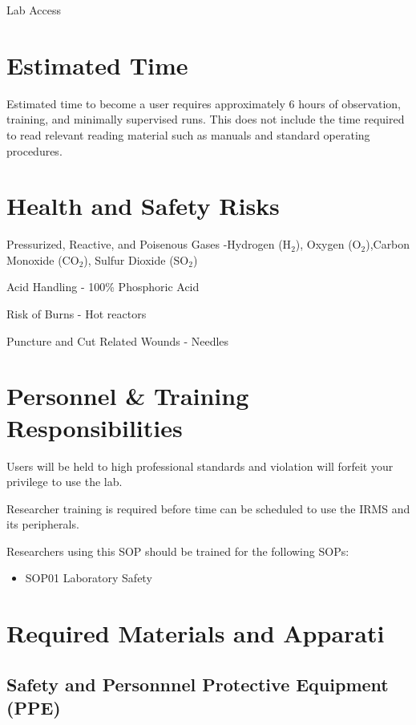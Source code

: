 \documentclass[12pt]{../SOP3_beta}\usepackage[]{graphicx}\usepackage[]{color}
\begin{document}
\NP Lab Access

\section{Estimated Time}

\NP Estimated time to become a user requires approximately 6 hours of observation, training, and minimally supervised runs. This does not include the time required to read relevant reading material such as manuals and standard operating procedures.

\section{Health and Safety Risks}

\NP Pressurized, Reactive, and Poisenous Gases -Hydrogen (H$_2$), Oxygen (O$_2$),Carbon Monoxide (CO$_2$), Sulfur Dioxide (SO$_2$)

\NP Acid Handling - 100\% Phosphoric Acid

\NP Risk of Burns - Hot reactors

\NP Puncture and Cut Related Wounds - Needles

\section{Personnel \& Training Responsibilities}

\NP Users will be held to high professional standards and violation will forfeit your privilege to use the lab.

\NP Researcher training is required before time can be scheduled to use the IRMS and its peripherals.

\NP Researchers using this SOP should be trained for the following SOPs:

\begin{itemize}
  \item SOP01 Laboratory Safety
\end{itemize}

\section{Required Materials and Apparati}

\subsection{Safety and Personnnel Protective Equipment (PPE)}
\end{document}
